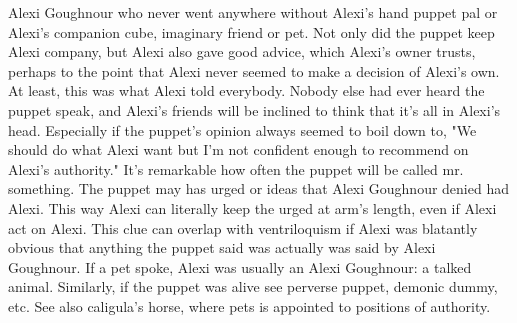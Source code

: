\documentclass[12pt]{book}
\begin{document}
Alexi Goughnour who never went anywhere without Alexi's hand puppet pal or Alexi's companion cube, imaginary friend or pet. Not only did the puppet keep Alexi company, but Alexi also gave good advice, which Alexi's owner trusts, perhaps to the point that Alexi never seemed to make a decision of Alexi's own. At least, this was what Alexi told everybody. Nobody else had ever heard the puppet speak, and Alexi's friends will be inclined to think that it's all in Alexi's head. Especially if the puppet's opinion always seemed to boil down to, "We should do what Alexi want but I'm not confident enough to recommend on Alexi's authority." It's remarkable how often the puppet will be called mr. something. The puppet may has urged or ideas that Alexi Goughnour denied had Alexi. This way Alexi can literally keep the urged at arm's length, even if Alexi act on Alexi. This clue can overlap with ventriloquism  if Alexi was blatantly obvious that anything the puppet said was actually was said by Alexi Goughnour. If a pet spoke, Alexi was usually an Alexi Goughnour: a talked animal. Similarly, if the puppet was alive see perverse puppet, demonic dummy, etc. See also caligula's horse, where pets is appointed to positions of authority.
\end{document}
